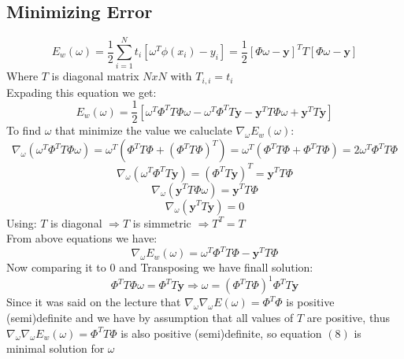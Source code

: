 \documentclass{article}
\begin{document}
\subsection{Minimizing Error}
\begin{equation}
    E_w(\omega)=\frac{1}{2}\sum_{i=1}^N t_i[\omega^T \phi(x_i)  - y_i] = 
    \frac{1}{2} [\Phi\omega - \mathbf{y}]^T T [\Phi\omega - \mathbf{y}] 
\end{equation}
Where $T$ is diagonal matrix $NxN$ with $T_{i,i} = t_i$\\
Expading this equation we get:
\begin{equation}
    E_w(\omega)= \frac{1}{2} [\omega^T\Phi^TT\Phi\omega - \omega^T\Phi^TT\mathbf{y} - \mathbf{y}^TT\Phi\omega + \mathbf{y}^TT\mathbf{y}]
\end{equation}
To find $\omega$ that minimize the value we caluclate $\nabla_\omega E_w(\omega)$:
\begin{equation}
    \nabla_\omega(\omega^T\Phi^TT\Phi\omega) = \omega^T(\Phi^TT\Phi + (\Phi^TT\Phi)^T) = \omega^T(\Phi^TT\Phi + \Phi^TT\Phi) =
    2\omega^T\Phi^TT\Phi 
\end{equation}
\begin{equation}
    \nabla_\omega(\omega^T\Phi^TT\mathbf{y}) = (\Phi^TT\mathbf{y})^T = \mathbf{y}^TT\Phi 
\end{equation}
\begin{equation}
    \nabla_\omega(\mathbf{y}^TT\Phi\omega) = \mathbf{y}^TT\Phi 
\end{equation}
\begin{equation}
    \nabla_\omega(\mathbf{y}^TT\mathbf{y}) = 0 
\end{equation}
Using: $T$ is diagonal $\Rightarrow T$ is simmetric $\Rightarrow T^T=T$\\
From above equations we have:
\begin{equation}
    \nabla_\omega E_w(\omega) = \omega^T\Phi^TT\Phi  - \mathbf{y}^TT\Phi 
\end{equation}
Now comparing it to $0$ and Transposing we have finall solution:
\begin{equation}
    \Phi^TT\Phi\omega = \Phi^TT\mathbf{y} \Rightarrow \omega=(\Phi^TT\Phi)^1\Phi^TT\mathbf{y} 
\end{equation}
Since it was said on the lecture that $\nabla_\omega \nabla_\omega E(\omega) = \Phi^T\Phi$ is positive (semi)definite and we have by 
assumption that all values of $T$ are positive, thus $\nabla_\omega \nabla_\omega E_w(\omega) = \Phi^TT\Phi$ is also positive (semi)definite, 
so equation $(8)$ is minimal solution for $\omega$  
\end{document}
